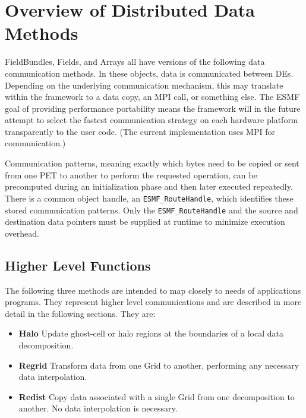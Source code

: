 
\section{Overview of Distributed Data Methods}

FieldBundles, Fields, and Arrays all have versions of the following
data communication methods.  In these objects, data is communicated 
between DEs.  Depending on the underlying communication 
mechanism, this may translate within the framework to a data 
copy, an MPI call, or something else.  
The ESMF goal of providing
performance portability means the framework will in the future
attempt to select the
fastest communication strategy on each hardware platform transparently 
to the user code.  (The current implementation uses MPI for communication.)

Communication patterns, meaning exactly which bytes need to be copied 
or sent from one PET to another to perform the requested operation,
can be precomputed during an initialization phase and then later 
executed repeatedly.
There is a common object handle, an {\tt ESMF\_RouteHandle}, which
identifies these stored communication patterns. 
Only the {\tt ESMF\_RouteHandle} and the source and destination 
data pointers must be supplied at runtime to minimize execution overhead.

\subsection{Higher Level Functions}
The following three methods are intended to map closely to 
needs of applications programs.  They represent higher level
communications and are described in more detail in the following
sections.  They are:

\begin{itemize}

\item {\bf Halo}
Update ghost-cell or halo regions at the boundaries
of a local data decomposition.
\item {\bf Regrid}
Transform data from one Grid to another, performing
any necessary data interpolation.
\item {\bf Redist}
Copy data associated with a single Grid from
one decomposition to another.  No data interpolation is necessary.

\end{itemize}

